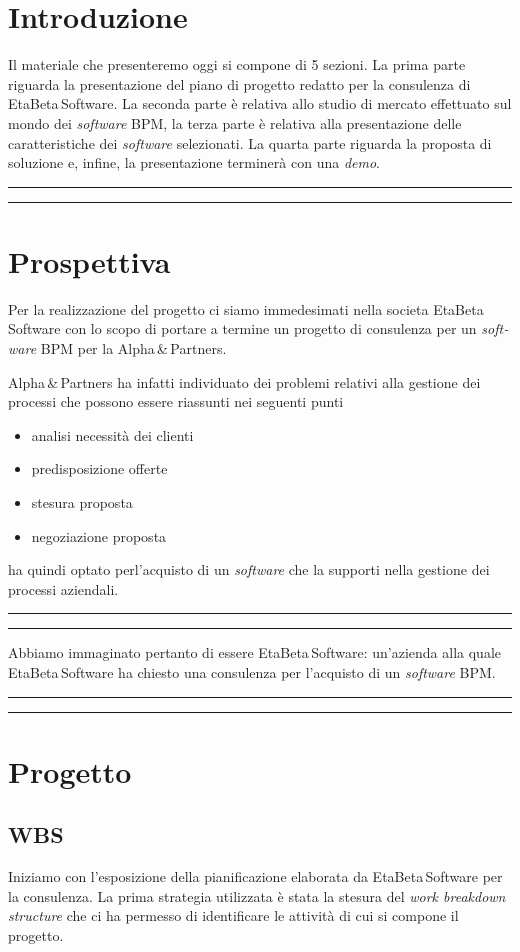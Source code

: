 \documentclass[a4paper,10pt]{article}
\newcommand{\inglese}[1]{\foreignlanguage{english}{\textit{#1}}}
\newcommand{\team}{\textsf{EtaBeta\,Software}\xspace}
\newcommand{\sw}{\inglese{software}\xspace}
\newcommand{\customer}{\textsf{Alpha\,\&\,Partners}\xspace}
\newcommand{\cambioslide}{%
\begin{center}
\Large
\rule[4pt]{0.2\linewidth}{.7pt} \ding{167} \rule[4pt]{0.2\linewidth}{.7pt}
\end{center}
}
\begin{document}
\section{Introduzione}
Il materiale che presenteremo oggi si compone di 5 sezioni. La prima parte riguarda la presentazione del piano di progetto redatto per la consulenza di \team. La seconda parte è relativa allo studio di mercato effettuato sul mondo dei \sw BPM, la terza parte è relativa alla presentazione delle caratteristiche dei \sw selezionati. La quarta parte riguarda la proposta di soluzione e, infine, la presentazione terminerà con una \inglese{demo}.

\cambioslide

\section{Prospettiva}
Per la realizzazione del progetto ci siamo immedesimati nella societa \team con lo scopo di portare a termine un progetto di consulenza per un \sw BPM per la \customer.

\customer ha infatti individuato dei problemi relativi alla gestione dei processi che possono essere riassunti nei seguenti punti
\begin{itemize}
  \item analisi necessità dei clienti
  \item predisposizione offerte
  \item stesura proposta
  \item negoziazione proposta
\end{itemize}
ha quindi optato perl'acquisto di un \sw che la supporti nella gestione dei processi aziendali.

\cambioslide

Abbiamo immaginato pertanto di essere \team: un'azienda alla quale \team ha chiesto una consulenza per l'acquisto di un \sw BPM.

\cambioslide

\section{Progetto}

\subsection{WBS}
Iniziamo con l'esposizione della pianificazione elaborata da \team per la consulenza. La prima strategia utilizzata è stata la stesura del \inglese{work breakdown structure} che ci ha permesso di identificare le attività di cui si compone il progetto.
\end{document}
